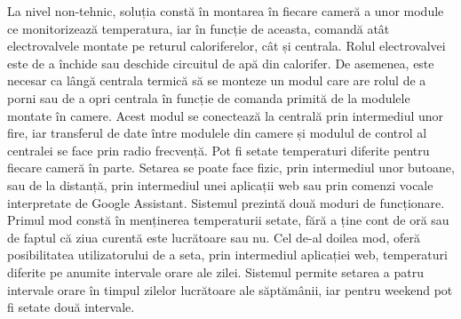 	La nivel non-tehnic, soluția constă în montarea în fiecare cameră a unor module ce monitorizează temperatura, iar în funcție de aceasta, comandă atât electrovalvele montate pe returul caloriferelor, cât și centrala. Rolul electrovalvei este de a închide sau deschide circuitul de apă din calorifer. De asemenea, este necesar ca lângă centrala termică să se monteze un modul care are rolul de a porni sau de a opri centrala în funcție de comanda primită de la modulele montate în camere. Acest modul se conectează la centrală prin intermediul unor fire, iar transferul de date între modulele din camere și modulul de control al centralei se face prin radio frecvență. Pot fi setate temperaturi diferite pentru fiecare cameră în parte. Setarea se poate face fizic, prin intermediul unor butoane, sau de la distanță, prin intermediul unei aplicații web sau prin comenzi vocale interpretate de Google Assistant. Sistemul prezintă două moduri de funcționare. Primul mod constă în menținerea temperaturii setate, fără a ține cont de oră sau de faptul că ziua curentă este lucrătoare sau nu. Cel de-al doilea mod, oferă posibilitatea utilizatorului de a seta, prin intermediul aplicației web, temperaturi diferite pe anumite intervale orare ale zilei. Sistemul permite setarea a patru intervale orare în timpul zilelor lucrătoare ale săptămânii, iar pentru weekend pot fi setate două intervale.
